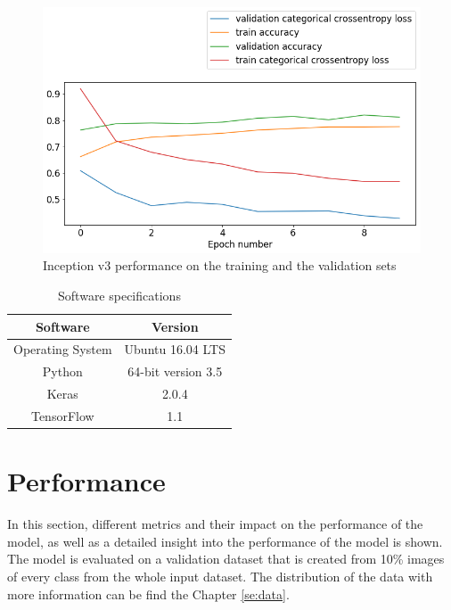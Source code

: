 \documentclass[times, utf8, diplomski]{fer}
\begin{document}
\begin{figure}
  \includegraphics[scale=0.61]{figures/inceptionv3_performance.png}
  \centering
  \caption{Inception v3 performance on the training and the validation sets}
  \label{fig:inceptionv3_performance}
\end{figure}


\begin{table}
\centering
\caption{Software specifications}
\label{tb:software_specifications}
\begin{tabular}{cc}
\hline 
Software & Version \\ \hline 
Operating System & Ubuntu 16.04 LTS \\ 
Python & 64-bit version 3.5 \\ 
Keras & 2.0.4 \\
TensorFlow & 1.1 \\
\hline 
\end{tabular} 
\end{table}

\section{Performance}

In this section, different metrics and their impact on the performance of the model, as well as a detailed insight into the performance of the model is shown. The model is evaluated on a validation dataset that is created from 10\% images of every class from the whole input dataset. The distribution of the data with more information can be find the Chapter \ref{se:data}.
\end{document}
